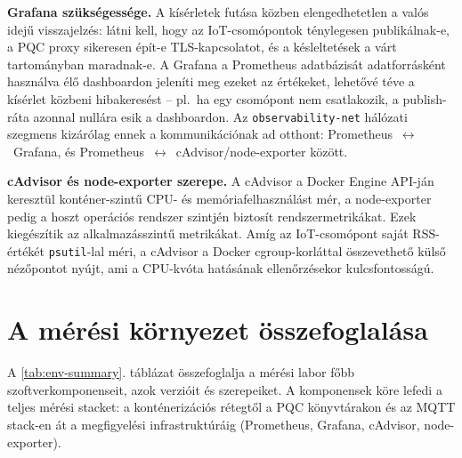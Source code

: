 \textbf{Grafana szükségessége.}
A kísérletek futása közben elengedhetetlen a valós idejű visszajelzés: látni kell, hogy
az IoT-csomópontok ténylegesen publikálnak-e, a PQC proxy sikeresen épít-e TLS-kapcsolatot,
és a késleltetések a várt tartományban maradnak-e. A Grafana a Prometheus adatbázisát
adatforrásként használva élő dashboardon jeleníti meg ezeket az értékeket, lehetővé téve
a kísérlet közbeni hibakeresést -- pl.\ ha egy csomópont nem csatlakozik, a publish-ráta
azonnal nullára esik a dashboardon. Az \texttt{observability-net} hálózati szegmens
kizárólag ennek a kommunikációnak ad otthont: Prometheus~$\leftrightarrow$~Grafana, és
Prometheus~$\leftrightarrow$~cAdvisor/node-exporter között.

\textbf{cAdvisor és node-exporter szerepe.}
A cAdvisor a Docker Engine API-ján keresztül konténer-szintű CPU- és memóriafelhasználást
mér, a node-exporter pedig a hoszt operációs rendszer szintjén biztosít rendszermetrikákat.
Ezek kiegészítik az alkalmazásszintű metrikákat. Amíg az IoT-csomópont saját RSS-értékét
\texttt{psutil}-lal méri, a cAdvisor a Docker cgroup-korláttal összevethető külső
nézőpontot nyújt, ami a CPU-kvóta hatásának ellenőrzésekor kulcsfontosságú.

\section{A mérési környezet összefoglalása}

A \ref{tab:env-summary}. táblázat összefoglalja a mérési labor főbb szoftverkomponenseit,
azok verzióit és szerepeiket. A komponensek köre lefedi a teljes mérési stacket: a
konténerizációs rétegtől a PQC könyvtárakon és az MQTT stack-en át a megfigyelési
infrastruktúráig (Prometheus, Grafana, cAdvisor, node-exporter).

